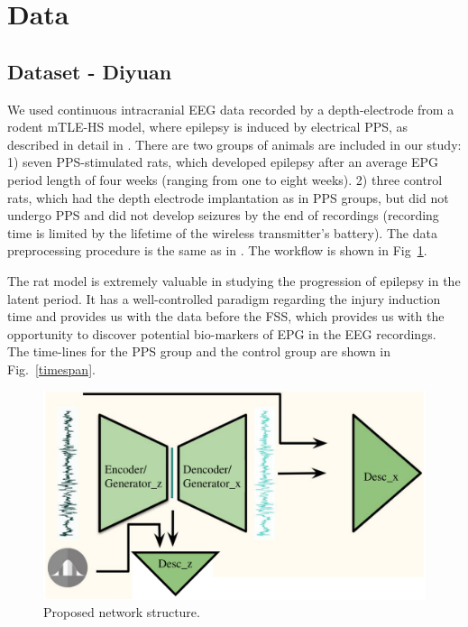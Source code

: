 \documentclass{article}
\begin{document}
	
	
	\section{Data}
	\subsection{Dataset - Diyuan}\label{dataset}
	
	We used continuous intracranial EEG data recorded by a depth-electrode from a rodent mTLE-HS model, where epilepsy is induced by electrical PPS, as described in detail in \cite{costard2019electrical}. There are two groups of animals are included in our study: 1) seven PPS-stimulated rats, which developed epilepsy after an average EPG period length of four weeks (ranging from one to eight weeks). 2) three control rats, which had the depth electrode implantation as in PPS groups, but did not undergo PPS and did not develop seizures by the end of recordings (recording time is limited by the lifetime of the wireless transmitter's battery). The data preprocessing procedure is the same as in \cite{lu2020towards}. The workflow is shown in Fig~\ref{workflow}. 
	
	The rat model is extremely valuable in studying the progression of epilepsy in the latent period. It has a well-controlled paradigm regarding  the injury induction time and provides us with the data before the FSS, which provides us with the opportunity to discover potential bio-markers of EPG in the EEG recordings. The time-lines for the PPS group and the control group are shown in Fig.~\ref{timespan}. 
	
	
	
	\begin{figure}[tb]
		\centering
		\includegraphics[width=0.9\linewidth]{figures/network_structure.pdf}
		\caption{Proposed network structure.}
		\label{workflow}
	\end{figure}
	\label{model}
	
\end{document}
